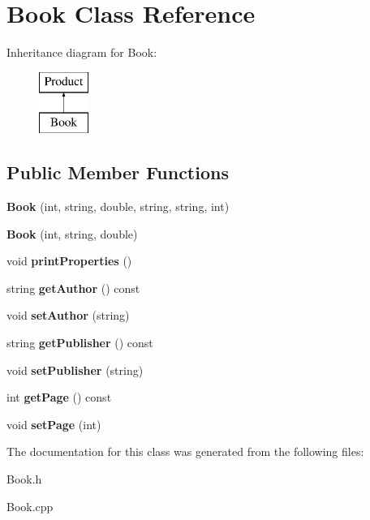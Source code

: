 \hypertarget{classBook}{}\section{Book Class Reference}
\label{classBook}
Inheritance diagram for Book\+:\begin{figure}[H]
\begin{center}
\leavevmode
\includegraphics[height=2.000000cm]{classBook}
\end{center}
\end{figure}
\subsection*{Public Member Functions}
\begin{DoxyCompactItemize}
\item 
\mbox{\label{classBook_af4bdcf29993e54f93e83af0f70648aac}} 
{\bfseries Book} (int, string, double, string, string, int)
\item 
\mbox{\label{classBook_aea2d37325e0b9f93637e3a47d8e2855b}} 
{\bfseries Book} (int, string, double)
\item 
\mbox{\label{classBook_ab430d9632f670b298b19c7b3e8d9acfc}} 
void {\bfseries print\+Properties} ()
\item 
\mbox{\label{classBook_a357d171d5d7c90340ee91a137edf958f}} 
string {\bfseries get\+Author} () const
\item 
\mbox{\label{classBook_a837c5dbedad676a780b955c7ccfba859}} 
void {\bfseries set\+Author} (string)
\item 
\mbox{\label{classBook_ad96401e4cfcc4adb2205a1a8ddbaa7e8}} 
string {\bfseries get\+Publisher} () const
\item 
\mbox{\label{classBook_ae1cc54edd9af29d7f05ef56a3a3039fc}} 
void {\bfseries set\+Publisher} (string)
\item 
\mbox{\label{classBook_a3199f3761e7b6a56af066028cd238d3b}} 
int {\bfseries get\+Page} () const
\item 
\mbox{\label{classBook_aa816ee3806073b0600aeb6d0f92cebfc}} 
void {\bfseries set\+Page} (int)
\end{DoxyCompactItemize}


The documentation for this class was generated from the following files\+:\begin{DoxyCompactItemize}
\item 
Book.\+h\item 
Book.\+cpp\end{DoxyCompactItemize}
